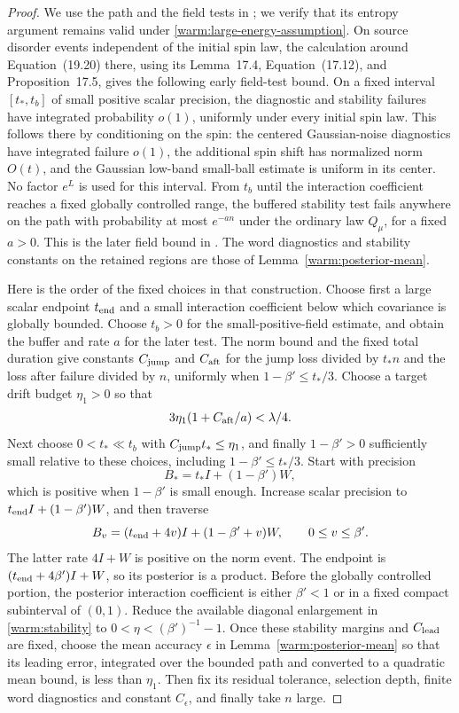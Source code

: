 \begin{proof}
We use the path and the field tests in
\cite[Section~19.6]{CM}; we verify that its entropy argument remains
valid under \eqref{warm:large-energy-assumption}.  On source disorder
events independent of the initial spin law, the calculation around
Equation~(19.20) there, using its Lemma~17.4, Equation~(17.12), and
Proposition~17.5, gives the following early field-test bound.
On a fixed interval \([t_*,t_b]\) of small
positive scalar precision, the diagnostic and stability failures
have integrated probability \(o(1)\), uniformly under every initial
spin law.  This follows there by conditioning on the spin: the
centered Gaussian-noise diagnostics have integrated failure \(o(1)\),
the additional spin shift has normalized norm \(O(t)\), and the
Gaussian low-band small-ball estimate is uniform in its center.
No factor \(e^L\) is used for this interval.  From \(t_b\) until
the interaction coefficient reaches a fixed globally controlled
range, the buffered stability test fails anywhere on the path with
probability at most \(e^{-a n}\) under the ordinary law \(Q_\mu\),
for a fixed \(a>0\).
This is the later field bound in \cite[Lemma~17.3, Section~19.4, and
Section~19.6 after Equation~(19.21)]{CM}.
The word diagnostics and stability constants on the retained
regions are those of Lemma~\ref{warm:posterior-mean}.

Here is the order of the fixed choices in that construction.  Choose
first a large scalar endpoint \(t_{\rm end}\) and a small interaction
coefficient below which covariance is globally bounded.  Choose
\(t_b>0\) for the small-positive-field estimate, and obtain the
buffer and rate \(a\) for the later test.  The norm bound and the
fixed total duration give constants \(C_{\rm jump}\) and
\(C_{\rm aft}\) for the jump loss divided by \(t_*n\) and the
loss after failure divided by \(n\), uniformly when
\(1-\beta'\le t_*/3\).  Choose a target drift budget \(\eta_1>0\)
so that
\[
 3\eta_1(1+C_{\rm aft}/a)<\lambda/4.
\]
Next choose \(0<t_*\ll t_b\) with
\(C_{\rm jump}t_*\le\eta_1\), and finally \(1-\beta'>0\)
sufficiently small relative to these choices, including
\(1-\beta'\le t_*/3\).  Start with precision
\[
 B_*=t_*I+(1-\beta')W,
\]
which is positive when \(1-\beta'\) is small enough.  Increase scalar
precision to \(t_{\rm end}I+(1-\beta')W\), and then traverse
\[
 B_v=(t_{\rm end}+4v)I+(1-\beta'+v)W,\qquad 0\le v\le\beta'.
\]
The latter rate \(4I+W\) is positive on the norm event.  The endpoint
is \( (t_{\rm end}+4\beta')I+W\), so its posterior is a product.
Before the globally controlled portion, the posterior interaction
coefficient is either \(\beta'<1\) or in a fixed compact subinterval
of \((0,1)\).  Reduce the available diagonal enlargement in
\eqref{warm:stability} to \(0<\eta<(\beta')^{-1}-1\).
Once these stability margins and \(C_{\rm lead}\) are fixed, choose
the mean accuracy \(\epsilon\) in Lemma~\ref{warm:posterior-mean}
so that its leading error, integrated over the bounded path and
converted to a quadratic mean bound, is less than \(\eta_1\).
Then fix its residual tolerance, selection depth, finite word
diagnostics and constant \(C_\epsilon\), and finally take \(n\)
large.


\end{proof}

